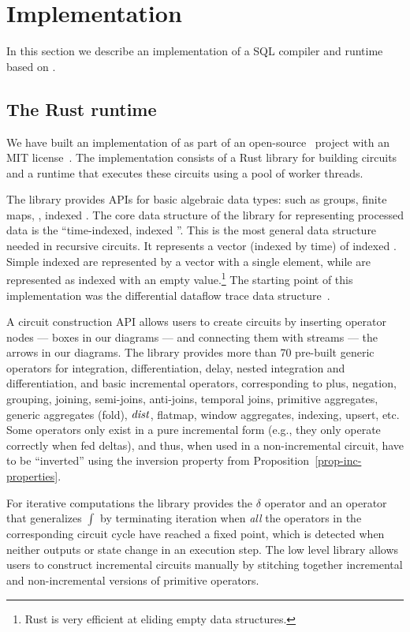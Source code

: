 \section{Implementation}\label{sec:implementation}

In this section we describe an implementation of a SQL compiler and
runtime based on \dbsp.

\subsection{The \dbsp Rust runtime}\label{sec:runtime}

We have built an implementation of \dbsp as part of an
open-source~\cite{dbsp-repo} project with an MIT
license~\cite{dbsp-crate}.  The implementation consists of a Rust
library for building circuits and a runtime that executes these
circuits using a pool of worker threads.

The library provides APIs for basic algebraic data types: such as
groups, finite maps, \zrs, indexed \zrs.  The core data structure of
the library for representing processed data is the ``time-indexed,
indexed \zr''.  This is the most general data structure needed in
recursive circuits.  It represents a vector (indexed by time) of
indexed \zrs.  Simple indexed \zrs are represented by a vector with a
single element, while \zrs are represented as indexed \zrs with an
empty value.\footnote{Rust is very efficient at eliding empty data
structures.}  The starting point of this implementation was the
differential dataflow trace data structure~\cite{dd-crate}.

A circuit construction API allows users to create \dbsp circuits by
inserting operator nodes --- boxes in our diagrams --- and connecting
them with streams --- the arrows in our diagrams.  The library
provides more than 70 pre-built generic operators for integration,
differentiation, delay, nested integration and differentiation, and
basic \zr incremental operators, corresponding to plus, negation,
grouping, joining, semi-joins, anti-joins, temporal joins, primitive
aggregates, generic aggregates (fold), $\mathit{dist}$, flatmap, window
aggregates, indexing, upsert, etc.  Some operators only exist in a
pure incremental form (e.g., they only operate correctly when fed
deltas), and thus, when used in a non-incremental circuit, have to be
``inverted'' using the inversion property from
Proposition~\ref{prop-inc-properties}.

For iterative computations the library provides the $\delta$ operator
and an operator that generalizes $\int$ by terminating iteration when
\emph{all} the operators in the corresponding circuit cycle have
reached a fixed point, which is detected when neither outputs or state
change in an execution step.  The low level library allows users to
construct incremental circuits manually by stitching together
incremental and non-incremental versions of primitive operators.

